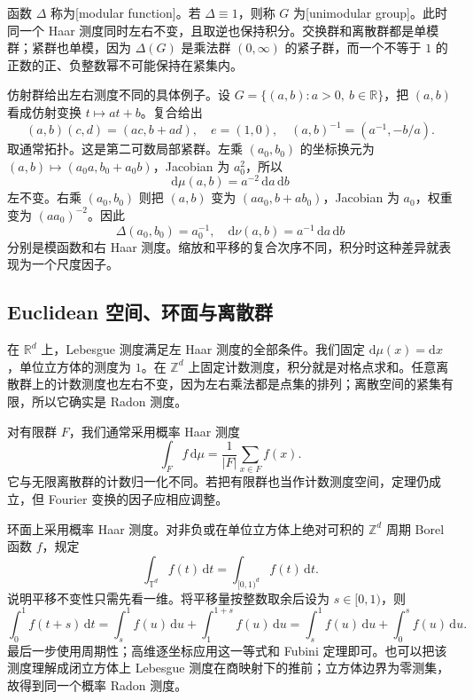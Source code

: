 函数 \(\Delta\) 称为[modular function]。若 \(\Delta\equiv1\)，则称 \(G\) 为[unimodular group]。此时同一个 Haar 测度同时左右不变，且取逆也保持积分。交换群和离散群都是单模群；紧群也单模，因为 \(\Delta(G)\) 是乘法群 \((0,\infty)\) 的紧子群，而一个不等于 \(1\) 的正数的正、负整数幂不可能保持在紧集内。

仿射群给出左右测度不同的具体例子。设 \(G=\{(a,b):a>0,\ b\in\mathbb R\}\)，把 \((a,b)\) 看成仿射变换 \(t\mapsto at+b\)。复合给出
\[
 (a,b)(c,d)=(ac,b+ad),\quad e=(1,0),\quad
 (a,b)^{-1}=(a^{-1},-b/a).
\]
取通常拓扑。这是第二可数局部紧群。左乘 \((a_0,b_0)\) 的坐标换元为 \((a,b)\mapsto(a_0a,b_0+a_0b)\)，Jacobian 为 \(a_0^2\)，所以
\[
 \mathrm d\mu(a,b)=a^{-2}\,\mathrm da\,\mathrm db
\]
左不变。右乘 \((a_0,b_0)\) 则把 \((a,b)\) 变为 \((aa_0,b+ab_0)\)，Jacobian 为 \(a_0\)，权重变为 \((aa_0)^{-2}\)。因此
\[
 \Delta(a_0,b_0)=a_0^{-1},\quad
 \mathrm d\nu(a,b)=a^{-1}\,\mathrm da\,\mathrm db
\]
分别是模函数和右 Haar 测度。缩放和平移的复合次序不同，积分时这种差异就表现为一个尺度因子。

\subsection{Euclidean 空间、环面与离散群}
\label{b2:subsec:I20103}

在 \(\mathbb R^d\) 上，Lebesgue 测度满足左 Haar 测度的全部条件。我们固定 \(\mathrm d\mu(x)=\mathrm dx\)，单位立方体的测度为 \(1\)。在 \(\mathbb Z^d\) 上固定计数测度，积分就是对格点求和。任意离散群上的计数测度也左右不变，因为左右乘法都是点集的排列；离散空间的紧集有限，所以它确实是 Radon 测度。

对有限群 \(F\)，我们通常采用概率 Haar 测度
\[
 \int_F f\,\mathrm d\mu=\frac1{|F|}\sum_{x\in F}f(x).
\]
它与无限离散群的计数归一化不同。若把有限群也当作计数测度空间，定理仍成立，但 Fourier 变换的因子应相应调整。

环面上采用概率 Haar 测度。对非负或在单位立方体上绝对可积的 \(\mathbb Z^d\) 周期 Borel 函数 \(f\)，规定
\[
 \int_{\mathbb T^d}f(t)\,\mathrm dt
 =\int_{[0,1)^d}f(t)\,\mathrm dt.
\]
说明平移不变性只需先看一维。将平移量按整数取余后设为 \(s\in[0,1)\)，则
\[
 \int_0^1f(t+s)\,\mathrm dt
 =\int_s^1f(u)\,\mathrm du+\int_1^{1+s}f(u)\,\mathrm du
 =\int_s^1f(u)\,\mathrm du+\int_0^sf(u)\,\mathrm du.
\]
最后一步使用周期性；高维逐坐标应用这一等式和 Fubini 定理即可。也可以把该测度理解成闭立方体上 Lebesgue 测度在商映射下的推前；立方体边界为零测集，故得到同一个概率 Radon 测度。


